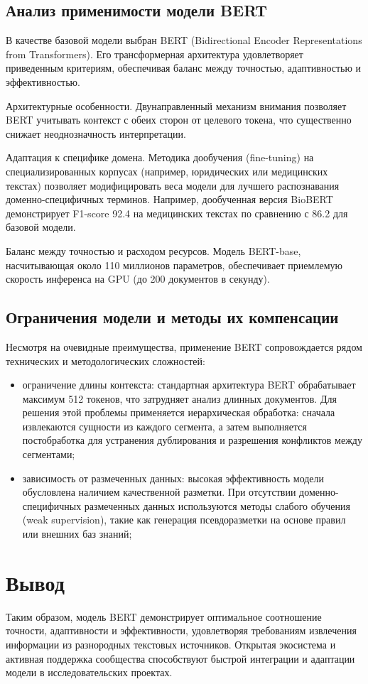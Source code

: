 \subsection{Анализ применимости модели BERT}

В качестве базовой модели выбран BERT (Bidirectional Encoder Representations from Transformers). Его трансформерная архитектура удовлетворяет приведенным критериям, обеспечивая баланс между точностью, адаптивностью и эффективностью.

Архитектурные особенности. Двунаправленный механизм внимания позволяет BERT учитывать контекст с обеих сторон от целевого токена, что существенно снижает неоднозначность интерпретации. 

Адаптация к специфике домена. Методика дообучения (fine-tuning) на специализированных корпусах (например, юридических или медицинских текстах) позволяет модифицировать веса модели для лучшего распознавания доменно-специфичных терминов. Например, дообученная версия BioBERT демонстрирует F1-score 92.4 на медицинских текстах по сравнению с 86.2 для базовой модели.

Баланс между точностью и расходом ресурсов. Модель BERT-base, насчитывающая около 110 миллионов параметров, обеспечивает приемлемую скорость инференса на GPU (до 200 документов в секунду).

\subsection{Ограничения модели и методы их компенсации}

Несмотря на очевидные преимущества, применение BERT сопровождается рядом технических и методологических сложностей:

\begin{itemize}
    \item ограничение длины контекста:  
    стандартная архитектура BERT обрабатывает максимум 512 токенов, что затрудняет анализ длинных документов. Для решения этой проблемы применяется иерархическая обработка: сначала извлекаются сущности из каждого сегмента, а затем выполняется постобработка для устранения дублирования и разрешения конфликтов между сегментами;

    \item зависимость от размеченных данных:
    высокая эффективность модели обусловлена наличием качественной разметки. При отсутствии доменно-специфичных размеченных данных используются методы слабого обучения (weak supervision), такие как генерация псевдоразметки на основе правил или внешних баз знаний;
\end{itemize}

\section*{Вывод}

Таким образом, модель BERT демонстрирует оптимальное соотношение точности, адаптивности и эффективности, удовлетворяя требованиям извлечения информации из разнородных текстовых источников. Открытая экосистема и активная поддержка сообщества способствуют быстрой интеграции и адаптации модели в исследовательских проектах.

\clearpage


